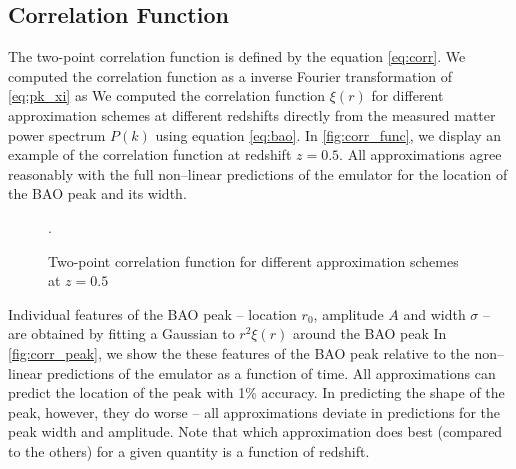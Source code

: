 \subsection{Correlation Function}
\label{sec:corr}
The two-point correlation function is defined by the equation \eqref{eq:corr}. We computed the correlation function as a inverse Fourier transformation of \eqref{eq:pk_xi} as
We computed the correlation function $\xi(r)$ for different approximation schemes at different redshifts directly from the measured matter power spectrum $P(k)$ using equation \eqref{eq:bao}. In \autoref{fig:corr_func}, we display an example of the correlation function at redshift $z=0.5$. All approximations agree reasonably with the full non--linear predictions of the emulator for the location of the BAO peak and its width.
\begin{figure}[bt]
\centering
	\begin{subfigure}{0.9\textwidth}
	\end{subfigure}
	\begin{subfigure}{0.9\textwidth}
		\centering
	\end{subfigure}
	\caption{Two-point correlation function for different approximation schemes at $z=0.5$}.
	\label{fig:corr_func}
\end{figure}

Individual features of the BAO peak -- location $r_0$, amplitude $A$ and width $\sigma$ -- are obtained by fitting a Gaussian to $r^2\xi(r)$ around the BAO peak
In \autoref{fig:corr_peak}, we show the these features of the BAO peak relative to the non--linear predictions of the emulator as a function of time. All approximations can predict the location of the peak with 1\% accuracy. In predicting the shape of the peak, however, they do worse -- all approximations deviate in predictions for the peak width and amplitude. Note that which approximation does best (compared to the others) for a given quantity is a function of redshift.



